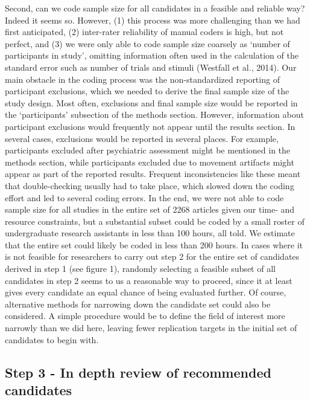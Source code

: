 \documentclass[
  man,floatsintext]{apa6}
\begin{document}
Second, can we code sample size for all candidates in a feasible and reliable way? Indeed it seems so. However, (1) this process was more challenging than we had first anticipated, (2) inter-rater reliability of manual coders is high, but not perfect, and (3) we were only able to code sample size coarsely as `number of participants in study', omitting information often used in the calculation of the standard error such as number of trials and stimuli (Westfall et al., 2014). Our main obstacle in the coding process was the non-standardized reporting of participant exclusions, which we needed to derive the final sample size of the study design. Most often, exclusions and final sample size would be reported in the `participants' subsection of the methods section. However, information about participant exclusions would frequently not appear until the results section. In several cases, exclusions would be reported in several places. For example, participants excluded after psychiatric assessment might be mentioned in the methods section, while participants excluded due to movement artifacts might appear as part of the reported results. Frequent inconsistencies like these meant that double-checking usually had to take place, which slowed down the coding effort and led to several coding errors. In the end, we were not able to code sample size for all studies in the entire set of 2268 articles given our time- and resource constraints, but a substantial subset could be coded by a small roster of undergraduate research assistants in less than 100 hours, all told. We estimate that the entire set could likely be coded in less than 200 hours. In cases where it is not feasible for researchers to carry out step 2 for the entire set of candidates derived in step 1 (see figure 1), randomly selecting a feasible subset of all candidates in step 2 seems to us a reasonable way to proceed, since it at least gives every candidate an equal chance of being evaluated further. Of course, alternative methods for narrowing down the candidate set could also be considered. A simple procedure would be to define the field of interest more narrowly than we did here, leaving fewer replication targets in the initial set of candidates to begin with.

\hypertarget{step-3---in-depth-review-of-recommended-candidates}{%
\subsection{Step 3 - In depth review of recommended candidates}\label{step-3---in-depth-review-of-recommended-candidates}}
\end{document}
